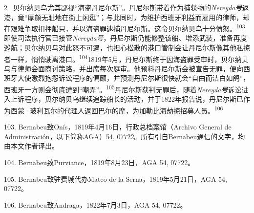 \documentclass[10pt,a4paper]{article}
\begin{document}
\begin{paracol}{2}
\switchcolumn*
{\scriptsize\color{gray} [p. 23]}\ 贝尔纳贝乌尤其鄙视“海盗丹尼尔斯”。丹尼尔斯带着作为捕获物的\textit{Nereyda号}返港，竟“厚颜无耻地在街上闲逛”；与此同时，为维护西班牙利益而雇用的律师，却在艰难争取扣押船只，并以海盗罪逮捕丹尼尔斯。这令贝尔纳贝乌十分愤\mbox{怒。\textsuperscript{103}}即使司法执行官已接管\textit{Nereyda号}，丹尼尔斯仍能修整该船、增添武装，准备再度巡航；贝尔纳贝乌对此怒不可遏，也担心松散的港口管制会让丹尼尔斯像其他私掠者一样，悄悄驶离港\mbox{口。\textsuperscript{104}}1819年5月，丹尼尔斯终于因海盗罪受审时，贝尔纳贝乌与律师会面商讨策略，并出席每次庭审。他预料丹尼尔斯会被宣告无罪，便向西班牙大使激烈抱怨诉讼程序的偏颇，并预测丹尼尔斯很快就会“自由而洁白如鸽”，西班牙一方则会彻底遭到“嘲弄”。\nobreak\textsuperscript{105}丹尼尔斯获判无罪后，随着\textit{Nereyda号}诉讼进入上诉程序，贝尔纳贝乌继续追踪船长的活动，并于1822年报告说，丹尼尔斯已作为西蒙·玻利瓦尔的代理人返回巴尔的摩，为加勒比海劫掠招募人\mbox{员。\textsuperscript{106}}\par{\small 103. Bernabeu致Onís，1819年4月16日，行政总档案馆（Archivo General de Administración，以下简称AGA）54, 07722。所有引自Bernabeu通信的文字，均由本文作者译出。\par}{\small 104. Bernabeu致Purviance，1819年8月23日，AGA 54, 07722。\par}{\small 105. Bernabeu致驻费城代办Mateo de la Serna，1819年5月21日，AGA 54, 07722。\par}{\small 106. Bernabeu致Andraga，1822年7月3日，AGA 54, 07722。\par}
\switchcolumn

\end{paracol}
\end{document}
